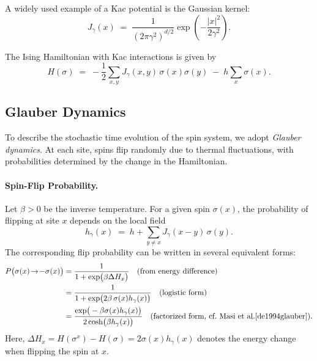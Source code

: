 \documentclass[11pt,a4paper]{article}
\begin{document}
A widely used example of a Kac potential is the Gaussian kernel:
\begin{equation}\label{eq:J-Gaussian}
J_\gamma(x) \;=\; \frac{1}{(2\pi\gamma^2)^{d/2}} 
\exp\!\left(-\frac{|x|^2}{2\gamma^2}\right).
\end{equation}

The Ising Hamiltonian with Kac interactions is given by
\begin{equation}\label{eq:H-Kac}
    H(\sigma) \;=\; -\frac{1}{2}\sum_{x,y} J_\gamma(x,y)\,\sigma(x)\sigma(y) \;-\; h \sum_{x} \sigma(x).
\end{equation}

\subsection{Glauber Dynamics}
\label{sec:glauber}
To describe the stochastic time evolution of the spin system, we adopt \emph{Glauber dynamics}. 
At each site, spins flip randomly due to thermal fluctuations, with probabilities determined by the change in the Hamiltonian.

\paragraph{Spin-Flip Probability.}  
Let $\beta > 0$ be the inverse temperature. 
For a given spin $\sigma(x)$, the probability of flipping at site $x$ depends on the local field
\begin{equation}\label{eq:hloc}
    h_{\gamma}(x) \;=\; h + \sum_{y\neq x} J_\gamma(x-y)\,\sigma(y).
\end{equation}
The corresponding flip probability can be written in several equivalent forms:
\begin{equation}\label{eq:flip-prob}
\begin{split}
    P\big(\sigma(x)\!\to\!-\sigma(x)\big) 
    &= \frac{1}{1 + \exp\!\big(\beta \Delta H_x\big)} 
        \quad \text{(from energy difference)} \\
    &= \frac{1}{1 + \exp\!\big(2\beta\,\sigma(x) h_{\gamma}(x)\big)} 
        \quad \text{(logistic form)} \\
    &= \frac{\exp\!\big(-\beta\sigma(x) h_{\gamma}(x)\big)}
            {2\cosh\!\big(\beta h_{\gamma}(x)\big)} 
        \quad \text{(factorized form, cf.~Masi et al.\cite{de1994glauber})}.
\end{split}
\end{equation}
Here, $\Delta H_x = H(\sigma^x) - H(\sigma) = 2\sigma(x)h_\gamma(x)$ denotes the energy change when flipping the spin at $x$.
\end{document}

